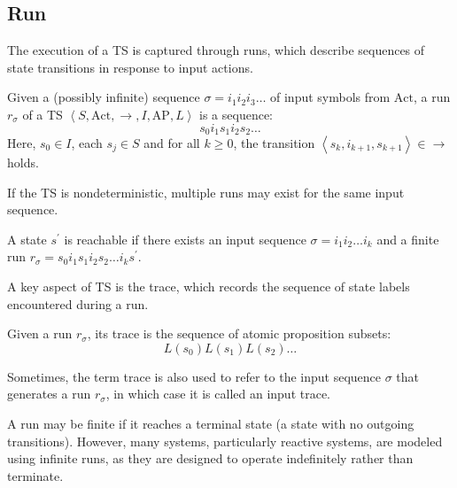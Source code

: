 \subsection{Run}
The execution of a TS is captured through runs, which describe sequences of state transitions in response to input actions.
\begin{definition}
    Given a (possibly infinite) sequence $\sigma = i_1i_2i_3\dots$ of input symbols from $\text{Act}$, a run $r_\sigma$ of a TS $\left\langle S,\text{Act},\rightarrow,I,\text{AP},L\right\rangle$ is a sequence: 
    \[s_0i_1s_1i_2s_2\dots\] 
    Here, $s_0\in I$, each $s_j \in S$ and for all $k \geq 0$, the transition $\left\langle s_k, i_{k+1}, s_{k+1}\right\rangle\in\rightarrow$ holds.
\end{definition}
\noindent If the TS is nondeterministic, multiple runs may exist for the same input sequence.
\begin{definition}
    A state $s^\prime$ is reachable if there exists an input sequence $\sigma = i_1i_2\dots i_k$ and a finite run $r_\sigma = s_0 i_1 s_1 i_2 s_2 \dots i_k s^\prime$.
\end{definition}

\noindent A key aspect of TS is the trace, which records the sequence of state labels encountered during a run.
\begin{definition}
    Given a run $r_\sigma$, its trace is the sequence of atomic proposition subsets:
    \[L(s_0) L(s_1) L(s_2)\dots\]
\end{definition}
\noindent Sometimes, the term trace is also used to refer to the input sequence $\sigma$ that generates a run $r_\sigma$, in which case it is called an input trace.

A run may be finite if it reaches a terminal state (a state with no outgoing transitions).
However, many systems, particularly reactive systems, are modeled using infinite runs, as they are designed to operate indefinitely rather than terminate.